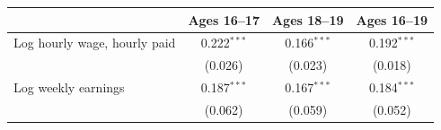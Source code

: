 \begin{tabular}{lccc}
\toprule
 & Ages 16--17 & Ages 18--19 & Ages 16--19 \\
\midrule
Log hourly wage, hourly paid & 0.222$^{***}$ & 0.166$^{***}$ & 0.192$^{***}$ \\
 & (0.026) & (0.023) & (0.018) \\
Log weekly earnings & 0.187$^{***}$ & 0.167$^{***}$ & 0.184$^{***}$ \\
 & (0.062) & (0.059) & (0.052) \\
\bottomrule
\end{tabular}
